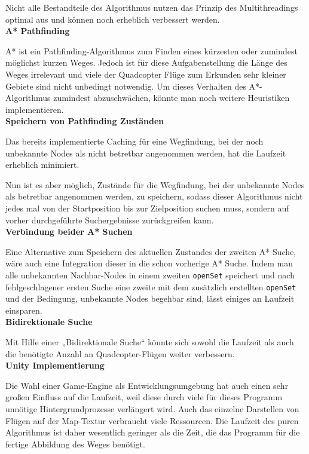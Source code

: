 \documentclass[a4paper,12pt]{article}
\newcommand{\code}{\texttt}
\begin{document}
Nicht alle Bestandteile des Algorithmus nutzen das Prinzip des Multithreadings optimal aus und können noch erheblich verbessert werden.
\\[0.4cm]
\textbf{A* Pathfinding}

A* ist ein Pathfinding-Algorithmus zum Finden eines kürzesten oder zumindest möglichst kurzen Weges. Jedoch ist für diese Aufgabenstellung die Länge des Weges irrelevant und viele der Quadcopter Flüge zum Erkunden sehr kleiner Gebiete sind nicht unbedingt notwendig. Um dieses Verhalten des A*-Algorithmus zumindest abzuschwächen, könnte man noch weitere Heuristiken implementieren.
\\[0.4cm]
\textbf{Speichern von Pathfinding Zuständen}

Das bereits implementierte Caching für eine Wegfindung, bei der noch unbekannte Nodes als nicht betretbar angenommen werden, hat die Laufzeit erheblich minimiert.

Nun ist es aber möglich, Zustände für die Wegfindung, bei der unbekannte Nodes als betretbar angenommen werden, zu speichern, sodass dieser Algorithmus nicht jedes mal von der Startposition bis zur Zielposition suchen muss, sondern auf vorher durchgeführte Suchergebnisse zurückgreifen kann.
\\[0.4cm]
\textbf{Verbindung beider A* Suchen}

Eine Alternative zum Speichern des aktuellen Zustandes der zweiten A* Suche, wäre auch eine Integration dieser in die schon vorherige A* Suche. Indem man alle unbekannten Nachbar-Nodes in einem zweiten \code{openSet} speichert und nach fehlgeschlagener ersten Suche eine zweite mit dem zusätzlich erstellten \code{openSet} und der Bedingung, unbekannte Nodes begehbar sind, lässt einiges an Laufzeit einsparen.
\\[0.4cm]
\textbf{Bidirektionale Suche}

Mit Hilfe einer „Bidirektionale Suche“ \cite{bidi_search} könnte sich sowohl die Laufzeit als auch die benötigte Anzahl an Quadcopter-Flügen weiter verbessern.
\\[0.4cm]
\textbf{Unity Implementierung}

Die Wahl einer Game-Engine als Entwicklungsumgebung hat auch einen sehr großen Einfluss auf die Laufzeit, weil diese durch viele für dieses Programm unnötige Hintergrundprozesse verlängert wird. Auch das einzelne Darstellen von Flügen auf der Map-Textur verbraucht viele Ressourcen. Die Laufzeit des puren Algorithmus ist daher wesentlich geringer als die Zeit, die das Programm für die fertige Abbildung des Weges benötigt.
\end{document}
